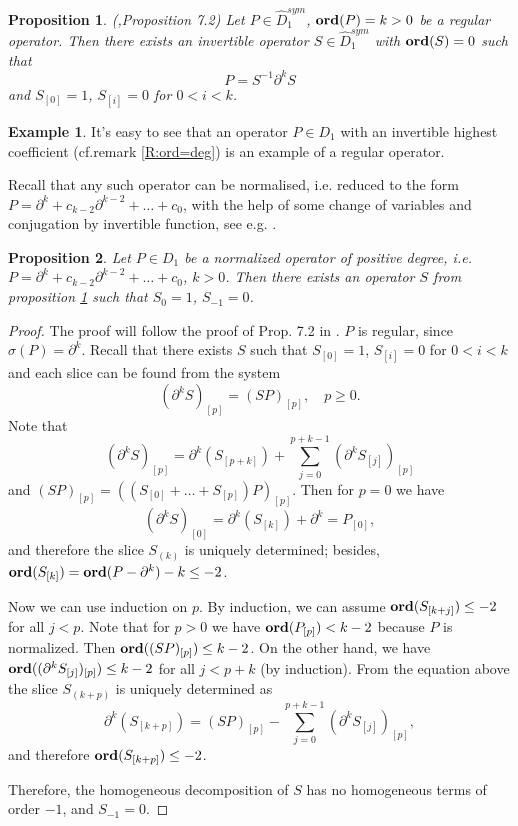 \documentclass[11pt]{article}
\theoremstyle{definition}
\newcommand{\Ord}{\mathop {\rm \bf ord}}
\newtheorem{ex}{Example}[section]
\theoremstyle{plain}
\newtheorem{Prop}{Proposition}[section]
\numberwithin{equation}{section}
\begin{document}
\begin{Prop}{(\cite{A.Z},Proposition 7.2)}
	\label{T:A.Z 7.2}
	Let $P\in  \hat{D}^{sym}_{1}$, $\Ord(P)=k>0$ be a regular operator. Then there exists an invertible operator $S\in  \hat{D}^{sym}_{1}$ with $\Ord (S)=0$ such that 
	$$P=S^{-1}\partial^{k}S $$
and $S_{[0]}=1$, $S_{[i]}=0$ for $0< i< k$. 
	
\end{Prop}

\begin{ex}
\label{Ex:normalised_dif_operators}
It's easy to see that an operator $P\in D_1$ with an invertible highest coefficient (cf.remark \ref{R:ord=deg}) is an example of a regular operator. 

Recall that any such operator can be normalised, i.e. reduced to the form $P=\partial^k + c_{k-2}\partial^{k-2}+\ldots + c_0$, with the help of some change of variables and conjugation by invertible function, see e.g. \cite[Prop. 1.3 and Rem. 1.6]{BZ}.
\end{ex}

\begin{Prop}
	\label{P:normalized_Schur}
	Let $P\in D_1$ be a normalized operator of positive degree, i.e. $P=\partial^k + c_{k-2}\partial^{k-2}+\ldots + c_0$, $k>0$. Then there exists an operator $S$ from proposition \ref{T:A.Z 7.2} such that $S_0=1$, $S_{-1}=0$. 
\end{Prop}

\begin{proof}
	The proof will follow the proof of Prop. 7.2 in \cite{A.Z}. $P$ is regular, since $\sigma (P)=\partial^k$.  Recall that there exists $S$ such that $S_{[0]}=1$, $S_{[i]}=0$ for $0< i < k$ and each slice can be found from the system
	$$
	(\partial^kS)_{[p]}=(SP)_{[p]}, \quad p\ge 0.
	$$ 
	Note that 
	$$
	(\partial^kS)_{[p]}=\partial^k(S_{[p+k]}) + \sum_{j=0}^{p+k-1}(\partial^kS_{[j]})_{[p]}
	$$ 
	and $(SP)_{[p]} = ((S_{[0]}+\ldots +S_{[p]})P)_{[p]}$. Then for $p=0$ we have
	$$
	(\partial^kS)_{[0]}=\partial^k(S_{[k]})+\partial^k=P_{[0]},
	$$
	and therefore the slice $S_{(k)}$ is uniquely determined; besides, $\Ord (S_{[k]})= \Ord (P- \partial^k)-k\le -2$. 
	
	Now we can use induction on $p$. By induction, we can assume $\Ord (S_{[k+j]})\le -2$ for all $j<p$.  
	Note that for $p>0$ we have $\Ord (P_{[p]})< k-2$ because $P$ is normalized. Then $\Ord ((SP)_{[p]})\le k-2$. On the other hand, we have $\Ord ((\partial^kS_{[j]})_{[p]})\le k-2$ for all $j<p+k$ (by induction). From the equation above the slice $S_{(k+p)}$ is uniquely determined as 
	$$
	\partial^k(S_{[k+p]})= (SP)_{[p]}-\sum_{j=0}^{p+k-1}(\partial^kS_{[j]})_{[p]},
	$$
	and therefore $\Ord (S_{[k+p]}) \le -2$. 
	
	Therefore, the homogeneous decomposition of $S$ has no homogeneous terms of order $-1$, and $S_{-1}=0$.
	
\end{proof}
\end{document}
